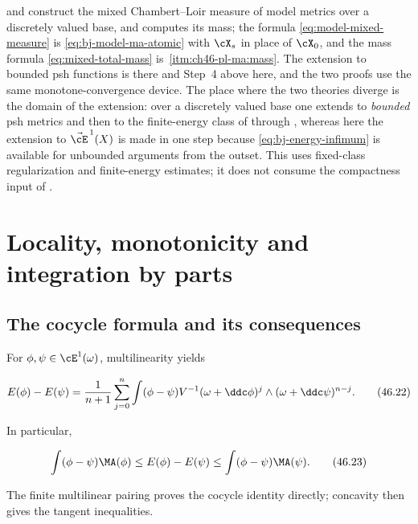 \begin{remark}
\label{rem:ch46-mixed-part3}
 and  construct the
mixed Chambert--Loir measure of model metrics over a discretely valued
base, and  computes its mass; the formula
\eqref{eq:model-mixed-measure} is \eqref{eq:bj-model-ma-atomic} with
$\cX_s$ in place of $\cX_0$, and the mass formula
\eqref{eq:mixed-total-mass} is
\,\cref{itm:ch46-pl-ma:mass}.  The extension to
bounded psh functions is  there and Step~4
above here, and the two proofs use the same monotone-convergence device.
The place where the two theories diverge is the domain of the extension:
over a discretely valued base one extends to \emph{bounded} psh metrics and
then to the finite-energy class of  through
, whereas here the extension to
$\vec\cE^{\,1}(X)$ is made in one step because
\eqref{eq:bj-energy-infimum} is available for unbounded arguments from the
outset.  This uses fixed-class regularization and finite-energy estimates; it does
not consume the compactness input of .
\end{remark}

\section{Locality, monotonicity and integration by parts}
\label{sec:ch46-ibp}

\subsection{The cocycle formula and its consequences}
\label{sec:ch46-cocycle}

For $\phi,\psi\in\cE^1(\omega)$, multilinearity yields

\[
 E(\phi)-E(\psi)
  =\frac1{n+1}\sum_{j=0}^n
       \int(\phi-\psi)
       V^{-1}(\omega+\ddc\phi)^j
       \wedge(\omega+\ddc\psi)^{n-j}.
\tag{46.22}\label{eq:bj-energy-cocycle}
\]

In particular,

\[
 \int(\phi-\psi)\MA(\phi)
 \leq E(\phi)-E(\psi)
 \leq\int(\phi-\psi)\MA(\psi).
\tag{46.23}\label{eq:bj-energy-tangent-inequalities}
\]

The finite multilinear pairing proves the cocycle identity directly;
concavity then gives the tangent inequalities.

